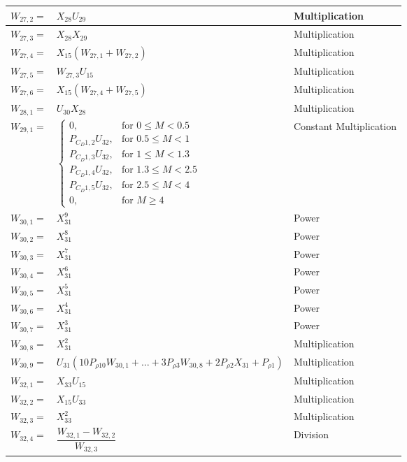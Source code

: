 {\begin{longtable}{|p{1.5cm}|l|p{2cm}|}
$W_{27,2}=$ & $ X_{28}U_{29} $ & Multiplication \\ \hline
$W_{27,3}=$ & $ X_{28}X_{29} $ & Multiplication \\ \hline
$W_{27,4}=$ & $ X_{15}\left(W_{27,1}+W_{27,2}\right) $ & Multiplication \\ \hline
$W_{27,5}=$ & $ W_{27,3}U_{15} $ & Multiplication \\ \hline
$W_{27,6}=$ & $ X_{15}\left(W_{27,4}+W_{27,5}\right) $ & Multiplication \\ \hline
$W_{28,1}=$ & $ U_{30}X_{28} $ & Multiplication \\ \hline
$W_{29,1}=$ & $ 
\begin{cases}
0, & \text{for } 0\leq M < 0.5\\
P_{C_{D} 1,2}U_{32}, &  \text{for } 0.5\leq M < 1 \\
P_{C_{D} 1,3}U_{32}, &  \text{for } 1\leq M < 1.3 \\
P_{C_{D} 1,4}U_{32}, &  \text{for } 1.3\leq M < 2.5 \\
P_{C_{D} 1,5}U_{32}, &  \text{for } 2.5\leq M < 4 \\
0, &  \text{for } M \geq 4 
\end{cases}
 $ & Constant \mbox{Multiplication} \\ \hline
$W_{30,1}=$ & $ X_{31}^9 $ & Power \\ \hline
$W_{30,2}=$ & $ X_{31}^8 $ & Power \\ \hline
$W_{30,3}=$ & $ X_{31}^7 $ & Power \\ \hline
$W_{30,4}=$ & $ X_{31}^6 $ & Power \\ \hline
$W_{30,5}=$ & $ X_{31}^5 $ & Power \\ \hline
$W_{30,6}=$ & $ X_{31}^4 $ & Power \\ \hline
$W_{30,7}=$ & $ X_{31}^3 $ & Power \\ \hline
$W_{30,8}=$ & $ X_{31}^2 $ & Multiplication \\ \hline
$W_{30,9}=$ & $ U_{31}\left(10P_{\rho 10}W_{30,1}+\dots +3P_{\rho 3}W_{30,8} + 2P_{\rho 2}X_{31}+P_{\rho 1}\right) $ & Multiplication \\ \hline
$W_{32,1}=$ & $ X_{33}U_{15} $ & Multiplication \\ \hline
$W_{32,2}=$ & $ X_{15}U_{33} $ & Multiplication \\ \hline
$W_{32,3}=$ & $ X_{33}^2 $ & Multiplication \\ \hline
$W_{32,4}=$ & $ \dfrac{W_{32,1}-W_{32,2}}{W_{32,3}} $ & Division \\ \hline

\end{longtable}}
